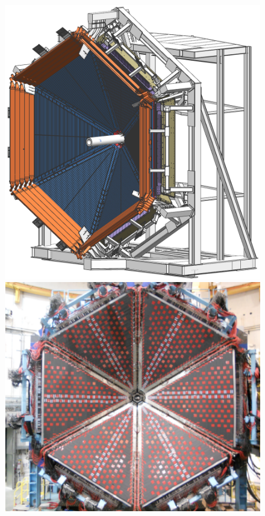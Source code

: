 \documentclass[final,3p,times,twocolumn,authoryear]{elsarticle}
\begin{document}

\begin{figure}[htbp!]
\hspace{0.3cm}\includegraphics[width=0.95\columnwidth]{fwd_carriage-1.png}
\hspace{0.3cm}\includegraphics[width=1.0\columnwidth]{FTOF-1b.png}

\end{figure}
\end{document}

